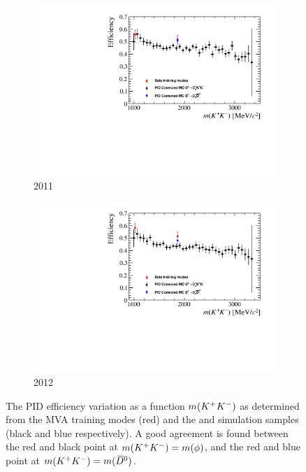 \begin{figure}[!h]
   \centering
   \begin{subfigure}[t]{0.4\textwidth}
      \includegraphics[width=1.0\textwidth]{figs/B2DsKK/mKK_eff_2011_Both.pdf}
      \caption{2011}
   \end{subfigure}
   \begin{subfigure}[t]{0.4\textwidth}
      \includegraphics[width=1.0\textwidth]{figs/B2DsKK/mKK_eff_2012_Both.pdf}
      \caption{2012}
   \end{subfigure}
   \caption{The PID efficiency variation as a function $m({{K}^+}{{K}^-})$ as determined from the MVA training modes (red) and the \decay{\Bp}{\Dsp\Kp\Km} and \decay{\Bp}{\Ds\Dzb} simulation samples (black and blue respectively). A good agreement is found between the red and black point at $m({{K}^+}{{K}^-})=m(\phi)$, and the red and blue point at $m({{K}^+}{{K}^-})=m({{\kern 0.2em\overline{\kern -0.2em D}{}}{}^0})$.}
   \label{fig:B2DsKK_PID_eff_crosscheck}
\end{figure}

